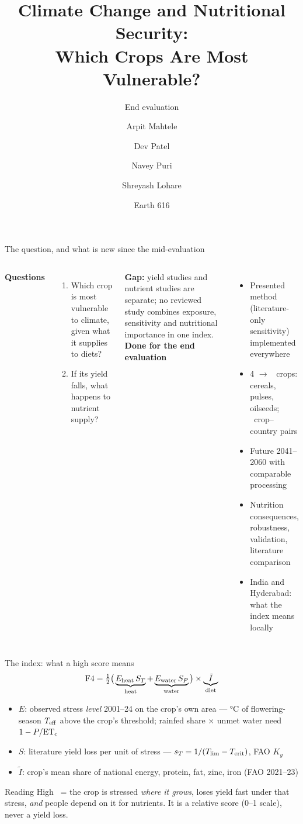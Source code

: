 \documentclass[aspectratio=169,11pt]{beamer}
\title{Climate Change and Nutritional Security:\\ Which Crops Are Most Vulnerable?}
\subtitle{End evaluation}
\author{Arpit Mahtele \and Dev Patel \and Navey Puri \and Shreyash Lohare}
\date{Earth 616}
\begin{document}
\begin{frame}\titlepage\end{frame}

\begin{frame}{The question, and what is new since the mid-evaluation}
\begin{columns}[T]
\textbf{Questions}
\begin{enumerate}
\item Which crop is most vulnerable to climate, given what it supplies to diets?
\item If its yield falls, what happens to nutrient supply?
\end{enumerate}
\textbf{Gap:} yield studies and nutrient studies are separate; no reviewed study combines exposure,
sensitivity and nutritional importance in one index.
\textbf{Done for the end evaluation}
\begin{itemize}
\item Presented method (literature-only sensitivity) implemented everywhere
\item 4 $\to$ \nCrops\ crops: cereals, pulses, oilseeds; \nPairs\ crop--country pairs
\item Future 2041--2060 with comparable processing
\item Nutrition consequences, robustness, validation, literature comparison
\item India and Hyderabad: what the index means locally
\end{itemize}
\end{columns}
\end{frame}

\begin{frame}{The index: what a high score means}
\[
\mathrm{F4} = \tfrac12\big(\underbrace{E_{\text{heat}}\,S_T}_{\text{heat}} + \underbrace{E_{\text{water}}\,S_P}_{\text{water}}\big)\times\underbrace{\tilde I}_{\text{diet}}
\]
\begin{itemize}
\item $E$: observed stress \emph{level} 2001--24 on the crop's own area --- \si{\celsius} of flowering-season
$T_{\mathrm{eff}}$ above the crop's threshold; rainfed share $\times$ unmet water need $1-P/\mathrm{ET_c}$
\item $S$: literature yield loss per unit of stress --- $s_T = 1/(T_{\lim}-T_{\mathrm{crit}})$, FAO $K_y$
\item $\tilde I$: crop's mean share of national energy, protein, fat, zinc, iron (FAO 2021--23)
\end{itemize}
\begin{block}{Reading}
High \Fd\ = the crop is stressed \emph{where it grows}, loses yield fast under that stress, \emph{and} people
depend on it for nutrients. It is a relative score (0--1 scale), never a yield loss.
\end{block}
\end{frame}
\end{document}
